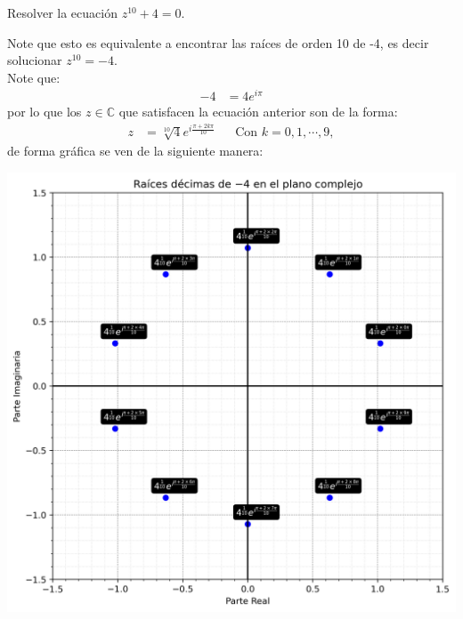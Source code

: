 \begin{homeworkProblem}
  Resolver la ecuación $z^{10}+4=0$.
  \begin{solution}
    Note que esto es equivalente a encontrar las raíces de orden 10 de -4, es decir solucionar $z^10=-4$.\\
    Note que:
    \begin{align*}
      -4&=4e^{i\pi}
    \end{align*}
    por lo que los $z\in\mathbb{C}$ que satisfacen la ecuación anterior son de la forma:
    \begin{align*}
      z&=\sqrt[10]{4}e^{i\frac{\pi+2k\pi}{10}} &&\text{Con $k=0,1,\cdots,9$},
    \end{align*}
    de forma gráfica se ven de la siguiente manera:
    \begin{center}
      \includegraphics[scale=0.4]{images/grafico_raices_decimas_-4.png}  
    \end{center}
  \end{solution}
\end{homeworkProblem}

